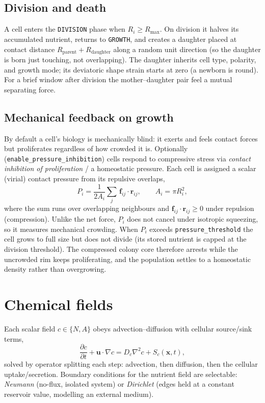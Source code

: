\documentclass[11pt]{article}
\newcommand{\vu}{\bm{u}}
\newcommand{\vf}{\bm{f}}
\newcommand{\vx}{\bm{x}}
\newcommand{\vr}{\bm{r}}
\newcommand{\grad}{\nabla}
\begin{document}
\subsection{Division and death}
A cell enters the \texttt{DIVISION} phase when $R_i \ge R_{\max}$. On division it
halves its accumulated nutrient, returns to \texttt{GROWTH}, and creates a
daughter placed at contact distance $R_{\text{parent}} + R_{\text{daughter}}$
along a random unit direction (so the daughter is born just touching, not
overlapping). The daughter inherits cell type, polarity, and growth mode; its
deviatoric shape strain starts at zero (a newborn is round). For a brief window
after division the mother--daughter pair feel a mutual separating force.

\subsection{Mechanical feedback on growth}\label{sec:pressure}
By default a cell's biology is mechanically blind: it exerts and feels contact
forces but proliferates regardless of how crowded it is. Optionally
(\texttt{enable\_pressure\_inhibition}) cells respond to compressive stress via
\emph{contact inhibition of proliferation} / a homeostatic pressure. Each cell is
assigned a scalar (virial) contact pressure from its repulsive overlaps,
\begin{equation}
  P_i = \frac{1}{2 A_i}\sum_{j}\,\vf_{ij}\cdot\vr_{ij}, \qquad A_i = \pi R_i^2,
\end{equation}
where the sum runs over overlapping neighbours and $\vf_{ij}\cdot\vr_{ij}\ge 0$
under repulsion (compression). Unlike the net force, $P_i$ does not cancel under
isotropic squeezing, so it measures mechanical crowding. When $P_i$ exceeds
\texttt{pressure\_threshold} the cell grows to full size but does not divide
(its stored nutrient is capped at the division threshold). The compressed colony
core therefore arrests while the uncrowded rim keeps proliferating, and the
population settles to a homeostatic density rather than overgrowing.

\section{Chemical fields}\label{sec:fields}

Each scalar field $c \in \{N, A\}$ obeys advection--diffusion with cellular
source/sink terms,
\begin{equation}
  \frac{\partial c}{\partial t} + \vu\cdot\grad c
  = D_c \grad^2 c + S_c(\vx,t),
\end{equation}
solved by operator splitting each step: advection, then diffusion, then the
cellular uptake/secretion. Boundary conditions for the nutrient field are
selectable: \emph{Neumann} (no-flux, isolated system) or \emph{Dirichlet}
(edges held at a constant reservoir value, modelling an external medium).
\end{document}
